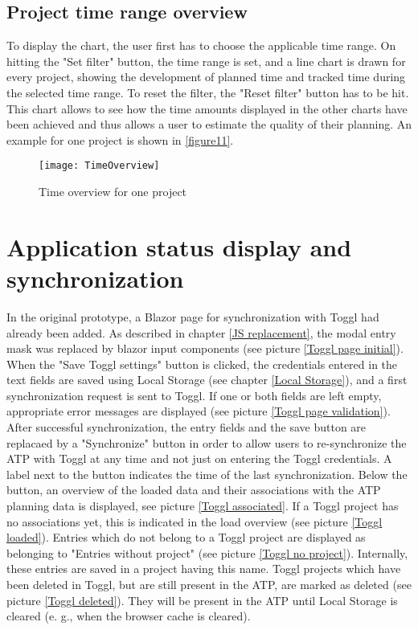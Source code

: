 \subsection{Project time range overview}
To display the chart, the user first has to choose the applicable time range. On hitting the "Set filter" button, the time range is set, and a line chart is drawn for every project, showing the development of planned time and tracked time during the selected time range. To reset the filter, the "Reset filter" button has to be hit. This chart allows to see how the time amounts displayed in the other charts have been achieved and thus allows a user to estimate the quality of their planning. An example for one project is shown in \ref{figure11}.
\begin{figure}[H]
	\centering
	\texttt{[image: TimeOverview]}
	\caption{Time overview for one project}
	\label{figure13}
\end{figure}

\section{Application status display and synchronization} \label{Status display}
In the original prototype, a Blazor page for synchronization with Toggl had already been added. As described in chapter \ref{JS replacement}, the modal entry mask was replaced by blazor input components (see picture \ref{Toggl page initial}). When the "Save Toggl settings" button is clicked, the credentials entered in the text fields are saved using Local Storage (see chapter \ref{Local Storage}), and a first synchronization request is sent to Toggl. If one or both fields are left empty, appropriate error messages are displayed (see picture \ref{Toggl page validation}). After successful synchronization, the entry fields and the save button are replacaed by a "Synchronize" button in order to allow users to re-synchronize the ATP with Toggl at any time and not just on entering the Toggl credentials. A label next to the button indicates the time of the last synchronization. Below the button, an overview of the loaded data and their associations with the ATP planning data is displayed, see picture \ref{Toggl associated}. If a Toggl project has no associations yet, this is indicated in the load overview (see picture \ref{Toggl loaded}). Entries which do not belong to a Toggl project are displayed as belonging to "Entries without project" (see picture \ref{Toggl no project}). Internally, these entries are saved in a project having this name. Toggl projects which have been deleted in Toggl, but are still present in the ATP, are marked as deleted (see picture \ref{Toggl deleted}). They will be present in the ATP until Local Storage is cleared (e. g., when the browser cache is cleared).

